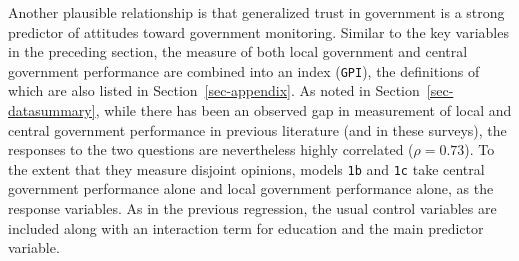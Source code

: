 \documentclass[
  letterpaper,
  DIV=11,
  numbers=noendperiod]{scrartcl}
\begin{document}
Another plausible relationship is that generalized trust in government
is a strong predictor of attitudes toward government monitoring. Similar
to the key variables in the preceding section, the measure of both local
government and central government performance are combined into an index
(\texttt{GPI}), the definitions of which are also listed in
Section~\ref{sec-appendix}. As noted in Section~\ref{sec-datasummary},
while there has been an observed gap in measurement of local and central
government performance in previous literature (and in these surveys),
the responses to the two questions are nevertheless highly correlated
(\(\rho=0.73\)). To the extent that they measure disjoint opinions,
models \texttt{1b} and \texttt{1c} take central government performance
alone and local government performance alone, as the response variables.
As in the previous regression, the usual control variables are included
along with an interaction term for education and the main predictor
variable.
\end{document}

